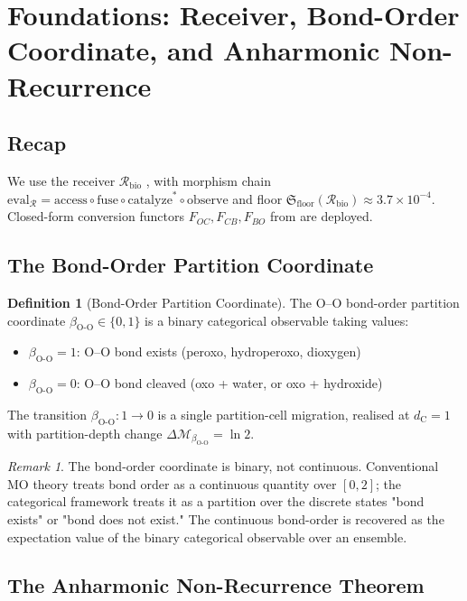 \documentclass[11pt,twocolumn,a4paper]{article}
\theoremstyle{definition}
\newtheorem{definition}[theorem]{Definition}
\theoremstyle{remark}
\newtheorem{remark}[theorem]{Remark}
\newcommand{\Recv}{\mathcal{R}}
\newcommand{\Floor}{\mathfrak{S}_{\mathrm{floor}}}
\newcommand{\eval}{\mathrm{eval}}
\newcommand{\depth}{\mathcal{M}}
\newcommand{\dC}{d_{\mathrm{C}}}
\newcommand{\bondorder}{\beta_{\mathrm{O\text{-}O}}}
\begin{document}
\section{Foundations: Receiver, Bond-Order Coordinate, and Anharmonic Non-Recurrence}
\label{sec:foundations}

\subsection{Recap}

We use the receiver $\Recv_{\mathrm{bio}}$ \citep{sachikonye2025_paper1}, with
morphism chain $\eval_{\Recv} = \mathrm{access} \circ \mathrm{fuse} \circ
\mathrm{catalyze}^* \circ \mathrm{observe}$ and floor $\Floor(\Recv_{\mathrm{bio}})
\approx 3.7 \times 10^{-4}$. Closed-form conversion functors
$F_{OC}, F_{CB}, F_{BO}$ from \citep{sachikonye2025_isomorphism} are deployed.

\subsection{The Bond-Order Partition Coordinate}

\begin{definition}[Bond-Order Partition Coordinate]
\label{def:bond_order}
The O--O bond-order partition coordinate $\bondorder \in \{0, 1\}$ is a
binary categorical observable taking values:
\begin{itemize}[nosep]
\item $\bondorder = 1$: O--O bond exists (peroxo, hydroperoxo, dioxygen)
\item $\bondorder = 0$: O--O bond cleaved (oxo + water, or oxo + hydroxide)
\end{itemize}
The transition $\bondorder: 1 \to 0$ is a single partition-cell migration,
realised at $\dC = 1$ with partition-depth change
$\Delta\depth_{\bondorder} = \ln 2$.
\end{definition}

\begin{remark}
The bond-order coordinate is binary, not continuous. Conventional MO theory
treats bond order as a continuous quantity over $[0, 2]$; the categorical
framework treats it as a partition over the discrete states "bond exists" or
"bond does not exist." The continuous bond-order is recovered as the
expectation value of the binary categorical observable over an ensemble.
\end{remark}

\subsection{The Anharmonic Non-Recurrence Theorem}
\end{document}
